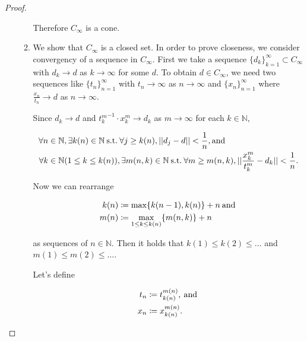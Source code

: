 \documentclass[a4paper,11pt]{jsarticle}
\newcommand{\NaturalNumberSet}{\mathbb{N}}
\newcommand{\SuchThat}{\:\text{s.t.}\:}
\begin{document}
\begin{proof}
\begin{enumerate}[label=\roman*,align=CenterWithParen]
\begin{enumerate}[label=i-\alph*,align=CenterWithParen]
        Therefore $C_{\infty}$ is a cone.

        \item We show that $C_{\infty}$ is a closed set. In order to prove closeness, we consider convergency of a sequence in $C_{\infty}$. First we take a sequence $\{d_k\}_{k=1}^{\infty} \subset C_{\infty}$ with $d_k \rightarrow d$ as $k \rightarrow \infty$ for some $d$. To obtain $d \in C_{\infty}$, we need two sequences like $\{t_n\}_{n=1}^{\infty}$ with $t_n \rightarrow \infty$ as $n \rightarrow \infty$ and $\{x_n\}_{n=1}^{\infty}$ where $\frac{x_n}{t_n} \rightarrow d$ as $n \rightarrow \infty$.

        Since $d_k \rightarrow d$ and ${t_k^m}^{-1} \cdot x_k^m \rightarrow d_k$ as $m \rightarrow \infty$ for each $k \in \NaturalNumberSet$,

        \begin{equation}
          \begin{split}
            \forall n &\in \NaturalNumberSet, \exists k(n) \in \NaturalNumberSet \SuchThat \forall j \geq k(n), ||d_j -d|| < \frac{1}{n}, \text{and} \\
            \forall k &\in \NaturalNumberSet (1 \leq k \leq k(n)), \exists m(n,k) \in \NaturalNumberSet \SuchThat \forall m \geq m(n,k), ||\frac{x_k^m}{t_k^m} -d_k|| < \frac{1}{n}. \notag
          \end{split}
        \end{equation}

        Now we can rearrange

        \begin{equation}
          \begin{split}
          k(n) &\coloneqq \max\{k(n-1),k(n)\} + n \:\text{and}\: \\
          m(n) &\coloneqq \max_{1 \leq k \leq k(n)}\{m(n,k)\} + n \notag
          \end{split}
        \end{equation}

        as sequences of $n \in \NaturalNumberSet$. Then it holds that $k(1) \leq k(2) \leq \ldots$ and $m(1) \leq m(2) \leq \ldots$.

        Let's define

        \begin{equation}
          \begin{split}
            t_n &\coloneqq t_{k(n)}^{m(n)}, \:\text{and}\: \\
            x_n &\coloneqq x_{k(n)}^{m(n)}. \notag
          \end{split}
        \end{equation}


\end{enumerate}
\end{enumerate}
\end{proof}
\end{document}

